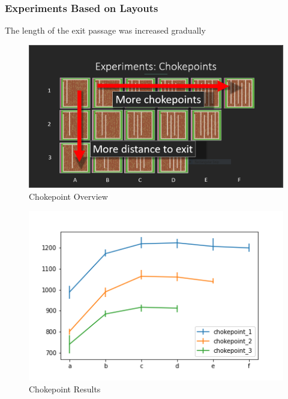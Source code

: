 \documentclass[12pt,letterpaper]{article}
\begin{document}
\subsubsection{Experiments Based on Layouts}
The length of the exit passage was increased gradually
\begin{figure}
  \includegraphics[width=\linewidth]{./figures/chokepoints_summary.png}
  \caption{Chokepoint Overview}
\end{figure}
\begin{figure}
  \includegraphics[width=\linewidth]{./figures/chokepoint_graph.png}
  \caption{Chokepoint Results}
\end{figure}
\end{document}
